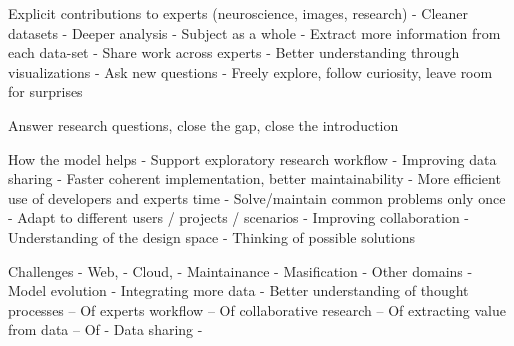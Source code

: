 Explicit contributions to experts (neuroscience, images, research)
- Cleaner datasets
- Deeper analysis
- Subject as a whole
- Extract more information from each data-set
- Share work across experts
- Better understanding through visualizations
- Ask new questions
- Freely explore, follow curiosity, leave room for surprises


Answer research questions, close the gap, close the introduction


How the model helps
- Support exploratory research workflow
- Improving data sharing
- Faster coherent implementation, better maintainability
- More efficient use of developers and experts time
- Solve/maintain common problems only once 
- Adapt to different users / projects / scenarios
- Improving collaboration
- Understanding of the design space
- Thinking of possible solutions


Challenges
- Web,
- Cloud,
- Maintainance
- Masification
- Other domains
- Model evolution
- Integrating more data
- Better understanding of thought processes
	-- Of experts workflow
	-- Of collaborative research
	-- Of extracting value from data
	-- Of 
- Data sharing
- 
